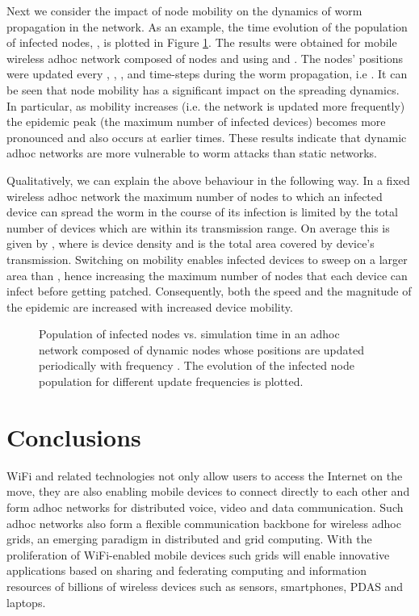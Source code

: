 \documentclass{elsart}
\begin{document}
Next we consider the impact of node mobility on the dynamics of worm 
propagation in the network. As an example, 
the time evolution of the population of infected nodes, , is
plotted in Figure \ref{f:it}. The results were obtained for mobile 
wireless adhoc network composed of  nodes and 
using   and . 
The nodes' positions were updated every , , ,  and  
time-steps during 
the worm propagation, i.e . It can be seen 
that node mobility has a significant impact on the spreading dynamics.
In particular, as mobility increases (i.e. the network is updated 
more frequently) the epidemic peak (the maximum number of 
infected devices) becomes more pronounced 
and also occurs at earlier times. These results 
indicate that dynamic adhoc networks are  more vulnerable to  
worm attacks than static networks. 

Qualitatively, we can explain the above behaviour in the following way. 
In a fixed wireless adhoc network the  maximum number of nodes to 
which an infected device can spread the worm in the course of its 
infection is limited by the 
total number of devices which are within its transmission range. On average 
this is given by , where  is device density and  is 
the total area covered by device's transmission. Switching on mobility enables 
infected devices to sweep on a larger area than ,
hence increasing the maximum  number of nodes that  each device can infect 
before getting patched. Consequently, both the speed and the magnitude of the 
epidemic are increased with increased device mobility.

\begin{figure}
\centering
{}
\caption{Population of infected nodes vs. simulation time in an adhoc network
composed of dynamic nodes whose positions are updated periodically with frequency
. The evolution of the infected node population for different update
frequencies is plotted.}
\label{f:it}
\end{figure}


\section{Conclusions}
WiFi and related technologies not only allow  users to access the Internet 
on the move, they are also enabling mobile devices to connect directly 
to each other and  form adhoc networks for distributed 
voice, video and data communication. Such adhoc networks also form a flexible 
communication backbone for wireless adhoc grids, an emerging paradigm in 
distributed and grid computing.
With the proliferation of WiFi-enabled mobile devices such grids will 
enable innovative applications based on sharing and federating 
computing and information resources of billions of wireless devices such as
sensors, smartphones, PDAS and laptops.
\end{document}
